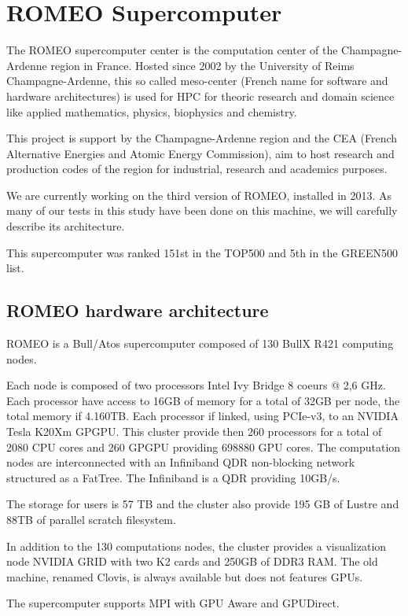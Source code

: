\section{ROMEO Supercomputer}

The ROMEO supercomputer center is the computation center of the Champagne-Ardenne region in France. 
Hosted since 2002 by the University of Reims Champagne-Ardenne, this so called meso-center (French name for software and hardware architectures) is used for HPC for theoric research and domain science like applied mathematics, physics, biophysics and chemistry. 

This project is support by the Champagne-Ardenne region and the CEA (French Alternative Energies and Atomic Energy Commission), aim to host research and production codes of the region for industrial, research and academics purposes. 

We are currently working on the third version of ROMEO, installed in 2013. 
As many of our tests in this study have been done on this machine, we will carefully describe its architecture. 

This supercomputer was ranked 151st in the TOP500 and 5th in the GREEN500 list. 

\subsection{ROMEO hardware architecture}
ROMEO is a Bull/Atos supercomputer composed of 130 BullX R421 computing nodes. 

Each node is composed of two processors Intel Ivy Bridge 8 coeurs @ 2,6 GHz. 
Each processor have access to 16GB of memory for a total of 32GB per node, the total memory if 4.160TB. 
Each processor if linked, using PCIe-v3, to an NVIDIA Tesla K20Xm GPGPU. 
This cluster provide then 260 processors for a total of 2080 CPU cores and 260 GPGPU providing 698880 GPU cores. 
The computation nodes are interconnected with an Infiniband QDR non-blocking network structured as a FatTree. 
The Infiniband is a QDR providing 10GB/s. 

The storage for users is 57 TB and the cluster also provide 195 GB of Lustre and 88TB of parallel scratch filesystem. 

In addition to the 130 computations nodes, the cluster provides a visualization node NVIDIA GRID with two K2 cards and 250GB of DDR3 RAM. 
The old machine, renamed Clovis, is always available but does not features GPUs. 

The supercomputer supports MPI with GPU Aware and GPUDirect. 

